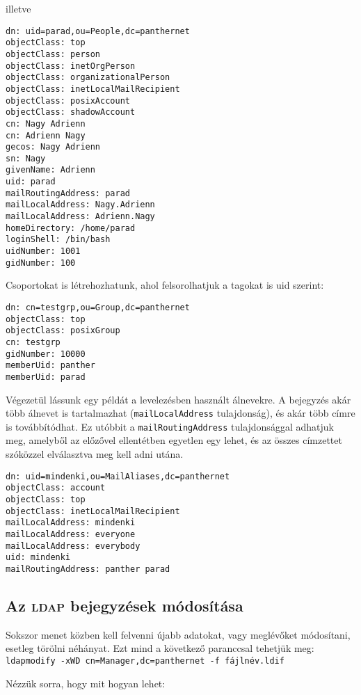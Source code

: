 \noindent illetve

\begin{Verbatim}[frame=single]
dn: uid=parad,ou=People,dc=panthernet
objectClass: top
objectClass: person
objectClass: inetOrgPerson
objectClass: organizationalPerson
objectClass: inetLocalMailRecipient
objectClass: posixAccount
objectClass: shadowAccount
cn: Nagy Adrienn
cn: Adrienn Nagy
gecos: Nagy Adrienn
sn: Nagy
givenName: Adrienn
uid: parad
mailRoutingAddress: parad
mailLocalAddress: Nagy.Adrienn
mailLocalAddress: Adrienn.Nagy
homeDirectory: /home/parad
loginShell: /bin/bash
uidNumber: 1001
gidNumber: 100
\end{Verbatim}

\noindent Csoportokat is létrehozhatunk, ahol felsorolhatjuk a tagokat is uid szerint:

\begin{Verbatim}[frame=single]
dn: cn=testgrp,ou=Group,dc=panthernet
objectClass: top
objectClass: posixGroup
cn: testgrp
gidNumber: 10000
memberUid: panther
memberUid: parad
\end{Verbatim}


Végezetül lássunk egy példát a levelezésben használt álnevekre. A bejegyzés akár több álnevet is tartalmazhat
(\texttt{mailLocalAddress} tulajdonság), és akár több címre is továbbítódhat. Ez utóbbit a \texttt{mailRoutingAddress}
tulajdonsággal adhatjuk meg, amelyből az előzővel ellentétben egyetlen egy lehet, és az összes címzettet szóközzel
elválasztva meg kell adni utána.

\begin{Verbatim}[frame=single]
dn: uid=mindenki,ou=MailAliases,dc=panthernet
objectClass: account
objectClass: top
objectClass: inetLocalMailRecipient
mailLocalAddress: mindenki
mailLocalAddress: everyone
mailLocalAddress: everybody
uid: mindenki
mailRoutingAddress: panther parad
\end{Verbatim}


\subsection{Az \textsc{ldap} bejegyzések módosítása}

Sokszor menet közben kell felvenni újabb adatokat, vagy meglévőket módosítani, esetleg törölni néhányat. Ezt mind a
következő paranccsal tehetjük meg:\\
\texttt{ldapmodify -xWD cn=Manager,dc=panthernet -f fájlnév.ldif}

Nézzük sorra, hogy mit hogyan lehet:

